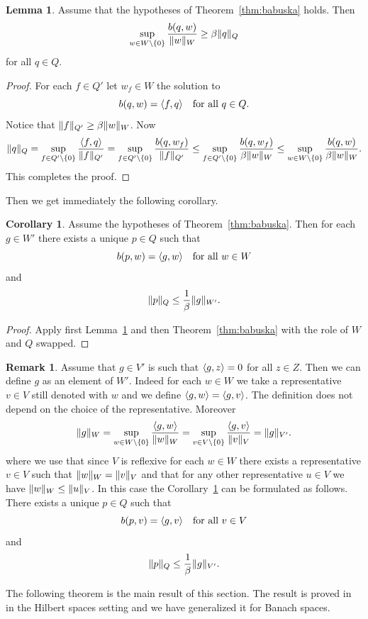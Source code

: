 \documentclass[a4paper,10pt,oneside]{amsbook}
\numberwithin{section}{chapter}
\numberwithin{equation}{chapter}
\theoremstyle{definition}
\newtheorem{cor}[prop]{Corollary}
\newtheorem{lemma}[prop]{Lemma}
\newtheorem{rmk}[prop]{Remark}
\DeclarePairedDelimiter{\norm}{\lVert}{\rVert}
\DeclarePairedDelimiter{\dual}{\langle}{\rangle}
\begin{document}
\begin{lemma}
\label{lemma:babuska}
Assume that the hypotheses of Theorem~\ref{thm:babuska} holds. Then
\[
\sup_{w\in W\setminus\{0\}}\frac{b(q,w)}{\norm{w}_W}\ge\beta\norm{q}_Q
\]
for all $q\in Q$.
\end{lemma}
\begin{proof}
For each $f\in Q'$ let $w_f\in W$ the solution to
\[
b(q,w)=\dual{f,q}\quad\text{for all $q\in Q$}.
\]
Notice that $\norm{f}_{Q'}\ge\beta\norm{w}_W$. Now
\[
\norm{q}_Q=\sup_{f\in Q'\setminus\{0\}}\frac{\dual{f,q}}{\norm{f}_{Q'}}=\sup_{f\in Q'\setminus\{0\}}\frac{b(q,w_f)}{\norm{f}_{Q'}}\le\sup_{f\in Q'\setminus\{0\}}\frac{b(q,w_f)}{\beta\norm{w}_{W}}\le\sup_{w\in W\setminus\{0\}}\frac{b(q,w)}{\beta\norm{w}_W}.
\]
This completes the proof.
\end{proof}
Then we get immediately the following corollary.
\begin{cor}
\label{cor:babuska}
Assume the hypotheses of Theorem~\ref{thm:babuska}. Then for each $g\in W'$ there exists a unique $p\in Q$ such that
\[
b(p,w)=\dual{g,w}\quad\text{for all $w\in W$}
\]
and
\[
\norm{p}_Q\le\frac{1}{\beta}\norm{g}_{W'}.
\]
\end{cor}
\begin{proof}
Apply first Lemma~\ref{lemma:babuska} and then Theorem~\ref{thm:babuska} with the role of $W$ and $Q$ swapped.
\end{proof}
\begin{rmk}
\label{rmk:babuska}
Assume that $g\in V'$ is such that $\dual{g,z}=0$ for all $z\in Z$. Then we can define $g$ as an element of $W'$. Indeed for each $w\in W$ we take a representative $v\in V$ still denoted with $w$ and we define $\dual{g,w}=\dual{g,v}$. The definition does not depend on the choice of the representative. Moreover
\[
\norm{g}_{W}=\sup_{w\in W\setminus\{0\}}\frac{\dual{g,w}}{\norm{w}_W}=\sup_{v\in V\setminus\{0\}}\frac{\dual{g,v}}{\norm{v}_V}=\norm{g}_{V'}.
\]
where we use that since $V$ is reflexive for each $w\in W$ there exists a representative $v\in V$ such that $\norm{w}_W=\norm{v}_V$ and that for any other representative $u\in V$ we have $\norm{w}_W\le\norm{u}_V$. In this case the Corollary~\ref{cor:babuska} can be formulated as follows. There exists a unique $p\in Q$ such that
\[
b(p,v)=\dual{g,v}\quad\text{for all $v\in V$}
\]
and
\[
\norm{p}_Q\le\frac{1}{\beta}\norm{g}_{V'}.
\]
\end{rmk}
The following theorem is the main result of this section. The result is proved in~\cite{nicolaides} in the Hilbert spaces setting and we have generalized it for Banach spaces.
\end{document}
